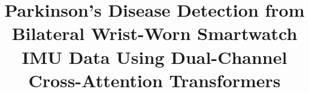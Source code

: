 \documentclass[conference]{IEEEtran}
\title{Parkinson's Disease Detection from Bilateral Wrist-Worn Smartwatch IMU Data Using Dual-Channel Cross-Attention Transformers}
\author{
  \IEEEauthorblockN{Author Name}
  \IEEEauthorblockA{\\
  University Name \\
  \texttt{author@email.edu}}
}
\begin{document}
\maketitle

\begin{abstract}
\end{abstract}
\end{document}
